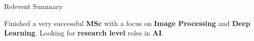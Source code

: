 \begin{cvsection}{Relevent Summary}



\indent Finished a very successful \textbf{MSc} with a focus on \textbf{Image Processing} and 
\textbf{Deep Learning}. Looking for \textbf{research level} roles in \textbf{AI}.




\end{cvsection}